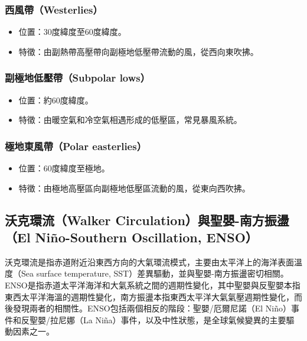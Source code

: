 \documentclass[a4paper,12pt]{report}
\begin{document}
\begin{itemize}
\subsubsection{西風帶（Westerlies）}
\begin{itemize}
  \item 位置：30度緯度至60度緯度。
  \item 特徵：由副熱帶高壓帶向副極地低壓帶流動的風，從西向東吹拂。
\end{itemize}
\subsubsection{副極地低壓帶（Subpolar lows）}
\begin{itemize}
  \item 位置：約60度緯度。
  \item 特徵：由暖空氣和冷空氣相遇形成的低壓區，常見暴風系統。
\end{itemize}
\subsubsection{極地東風帶（Polar easterlies）}
\begin{itemize}
  \item 位置：60度緯度至極地。
  \item 特徵：由極地高壓區向副極地低壓區流動的風，從東向西吹拂。
\end{itemize}
\subsection{沃克環流（Walker Circulation）與聖嬰-南方振盪（El Niño-Southern Oscillation, ENSO）}
沃克環流是指赤道附近沿東西方向的大氣環流模式，主要由太平洋上的海洋表面溫度（Sea surface temperature, SST）差異驅動，並與聖嬰-南方振盪密切相關。ENSO是指赤道太平洋海洋和大氣系統之間的週期性變化，其中聖嬰與反聖嬰本指東西太平洋海溫的週期性變化，南方振盪本指東西太平洋大氣氣壓週期性變化，而後發現兩者的相關性。ENSO包括兩個相反的階段：聖嬰/厄爾尼諾（El Niño）事件和反聖嬰/拉尼娜（La Niña）事件，以及中性狀態，是全球氣候變異的主要驅動因素之一。
\bct\bfH\ctr{}\ef\FB\ect

\end{itemize}
\end{document}
